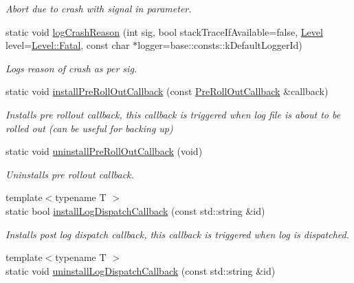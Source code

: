\begin{DoxyCompactItemize}
\begin{DoxyCompactList}\small\item\em Abort due to crash with signal in parameter. \end{DoxyCompactList}\item 
static void \hyperlink{classel_1_1_helpers_abf1ae61428740e1e6c5d5f0c36500faa}{log\+Crash\+Reason} (int sig, bool stack\+Trace\+If\+Available=false, \hyperlink{namespaceel_ab0ac6091262344c52dd2d3ad099e8e36}{Level} level=\hyperlink{namespaceel_ab0ac6091262344c52dd2d3ad099e8e36a882384ec38ce8d9582b57e70861730e4}{Level\+::\+Fatal}, const char $\ast$logger=base\+::consts\+::k\+Default\+Logger\+Id)
\begin{DoxyCompactList}\small\item\em Logs reason of crash as per sig. \end{DoxyCompactList}\item 
static void \hyperlink{classel_1_1_helpers_a5fd7ad6d636c28d2e706203d0c43cf8c}{install\+Pre\+Roll\+Out\+Callback} (const \hyperlink{namespaceel_aeb764b890a6f3cd41d2726bcd4e9c0cf}{Pre\+Roll\+Out\+Callback} \&callback)
\begin{DoxyCompactList}\small\item\em Installs pre rollout callback, this callback is triggered when log file is about to be rolled out (can be useful for backing up) \end{DoxyCompactList}\item 
static void \hyperlink{classel_1_1_helpers_ab829e5ed1b43bf965f5c288bc0280376}{uninstall\+Pre\+Roll\+Out\+Callback} (void)
\begin{DoxyCompactList}\small\item\em Uninstalls pre rollout callback. \end{DoxyCompactList}\item 
{\footnotesize template$<$typename T $>$ }\\static bool \hyperlink{classel_1_1_helpers_a3f3e84057567a8ac568a35899318544a}{install\+Log\+Dispatch\+Callback} (const std\+::string \&id)
\begin{DoxyCompactList}\small\item\em Installs post log dispatch callback, this callback is triggered when log is dispatched. \end{DoxyCompactList}\item 
{\footnotesize template$<$typename T $>$ }\\static void \hyperlink{classel_1_1_helpers_ac94b44cc8d399a5842703126478300d7}{uninstall\+Log\+Dispatch\+Callback} (const std\+::string \&id)

\end{DoxyCompactItemize}
